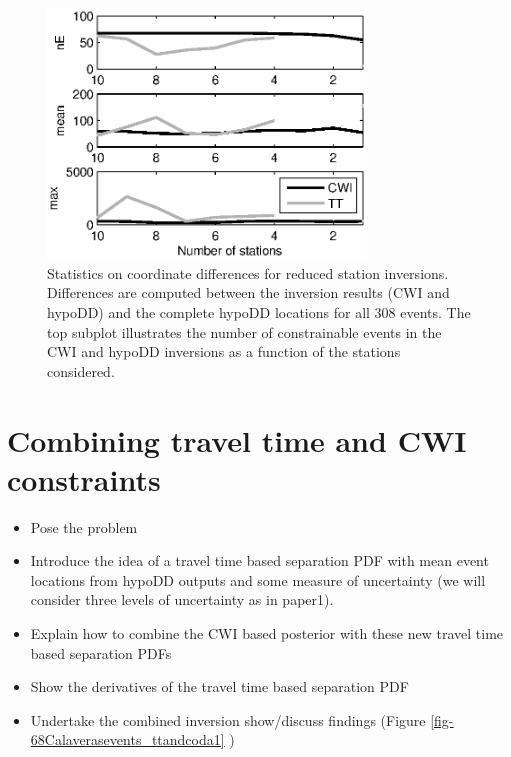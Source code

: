 \documentclass[extra]{gji}
\begin{document}
\begin{figure}
\noindent\includegraphics[width = 20pc]{diags/CalaverasLoc4_hypoDD_SVD.eps}
\caption{Statistics on coordinate differences for reduced station inversions. Differences
are computed between the inversion results (CWI and hypoDD) and the complete hypoDD
locations for all 308 events. The top subplot illustrates the number of constrainable
events in the CWI and hypoDD inversions as a function of the stations considered.}
\label{fig-statremoval_summarystats}
\end{figure}

\section{Combining travel time and CWI constraints}
\label{sec:CalaverasLoc-CWIandTT}
\begin{itemize}
\item Pose the problem
\item Introduce the idea of a travel time based separation PDF with mean event locations from hypoDD outputs and
some measure of uncertainty (we will consider three levels of uncertainty as in paper1).
\item Explain how to combine the CWI based posterior with these new travel time based separation PDFs
\item Show the derivatives of the travel time based separation PDF
\item Undertake the combined inversion show/discuss findings (Figure \ref{fig-68Calaverasevents_ttandcoda1} )
\end{itemize}
\end{document}
